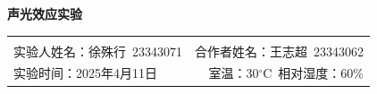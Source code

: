 \documentclass[12pt,a4paper,UTF8]{ctexart}
\begin{document}

\begin{center}
\LARGE\textbf{声光效应实验}
\end{center}

\begin{doublespacing}
	\begin{tabular}{lr}
	 & \\
	 {实验人姓名：徐殊行~23343071} & {合作者姓名：王志超~23343062}\\
	 {实验时间：2025年4月11日} & {室温：30$^{\circ}$C~相对湿度：60\%}
	
	\end{tabular}
\end{doublespacing}

\begin{abstract}
	本实验通过研究超声波在介质中引发的声光效应，验证了Bragg衍射与Raman-Nath衍射的特性及差异。
	实验中利用半导体激光器、声光器件（铌酸锂晶体）及超声波信号源等装置，分别调节并观测两种衍射模式下的光强分布、偏转角度及频率调制现象。
	通过测量衍射效率、声速、中心频率和带宽等参数，证实了Bragg衍射的高效率特性（理论最大效率接近$100\%$）及其在声光调制中的优势，同时对比了Raman-Nath衍射的多级衍射特性。
	此外，通过声光模拟通信实验，演示了声光器件将电信号转换为光信号的过程，验证了其在光通信中的应用潜力。
	实验结果表明，声光效应可通过调节声波频率和功率实现光强、方向及频率的精确控制，为声光器件的设计与应用提供了实践依据。\cite{xujieping200x}\cite{li1989crystaloptics}\cite{huang200x}

	\noindent \textbf{关键词：声光效应；Bragg衍射；Raman-Nath衍射；衍射效率；声光调制} 
		
\end{abstract}
	
\renewcommand{\abstractname}{Abstract}
\end{document}
